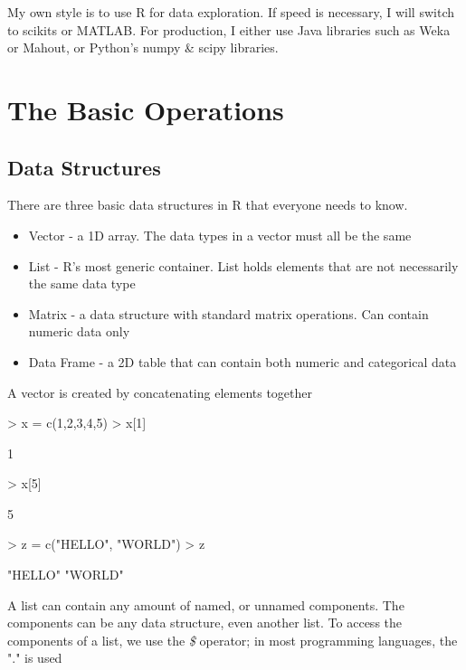 \documentclass{article}
\begin{document}
My own style is to use R for data exploration.  If speed is necessary, I will
switch to scikits or MATLAB.  For production, I either use Java libraries such as
Weka or Mahout, or Python's numpy \& scipy libraries.

\section{The Basic Operations}

\subsection{Data Structures}

There are three basic data structures in R that everyone needs to know.

\begin{itemize}
    \item Vector - a 1D array.  The data types in a vector must all be the same
    \item List - R's most generic container.  List holds elements that are not
        necessarily the same data type
    \item Matrix - a data structure with standard matrix operations.  Can contain
        numeric data only
    \item Data Frame - a 2D table that can contain both numeric and categorical
        data
\end{itemize}

A vector is created by concatenating elements together

\begin{Schunk}
\begin{Sinput}
> x = c(1,2,3,4,5)
> x[1]
\end{Sinput}
\begin{Soutput}
[1] 1
\end{Soutput}
\begin{Sinput}
> x[5]
\end{Sinput}
\begin{Soutput}
[1] 5
\end{Soutput}
\begin{Sinput}
> z = c("HELLO", "WORLD")
> z
\end{Sinput}
\begin{Soutput}
[1] "HELLO" "WORLD"
\end{Soutput}
\end{Schunk}

A list can contain any amount of named, or unnamed components.  The
components can be any data structure, even another list.  To access
the components of a list, we use the \textit{\$} operator; in most programming
languages, the "." is used
\end{document}

